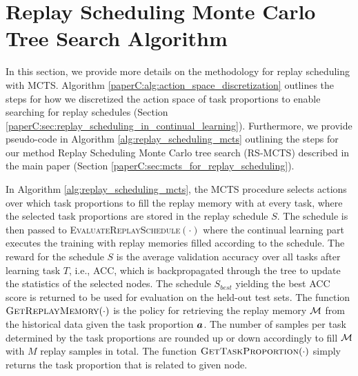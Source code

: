 

\section{Replay Scheduling Monte Carlo Tree Search Algorithm}\label{paperC:app:rs_mcts_algorithm}



In this section, we provide more details on the methodology for replay scheduling with MCTS. Algorithm \ref{paperC:alg:action_space_discretization} outlines the steps for how we discretized the action space of task proportions to enable searching for replay schedules (Section \ref{paperC:sec:replay_scheduling_in_continual_learning}). Furthermore, we provide pseudo-code in Algorithm \ref{alg:replay_scheduling_mcts} outlining the steps for our method Replay Scheduling Monte Carlo tree search (RS-MCTS) described in the main paper (Section \ref{paperC:sec:mcts_for_replay_scheduling}). 

In Algorithm \ref{alg:replay_scheduling_mcts}, the MCTS procedure selects actions over which task proportions to fill the replay memory with at every task, where the selected task proportions are stored in the replay schedule $S$. The schedule is then passed to \textsc{EvaluateReplaySchedule$(\cdot)$} where the continual learning part executes the training with replay memories filled according to the schedule. The reward for the schedule $S$ is the average validation accuracy over all tasks after learning task $T$, i.e., ACC, which is backpropagated through the tree to update the statistics of the selected nodes. The schedule $S_{best}$ yielding the best ACC score is returned to be used for evaluation on the held-out test sets. The function $\textsc{GetReplayMemory}(\cdot)$ is the policy for retrieving the replay memory ${\mathcal{M}}$ from the historical data given the task proportion ${\bm{a}}$. The number of samples per task determined by the task proportions are rounded up or down accordingly to fill ${\mathcal{M}}$ with $M$ replay samples in total. 
The function $\textsc{GetTaskProportion}(\cdot)$ simply returns the task proportion that is related to given node.


